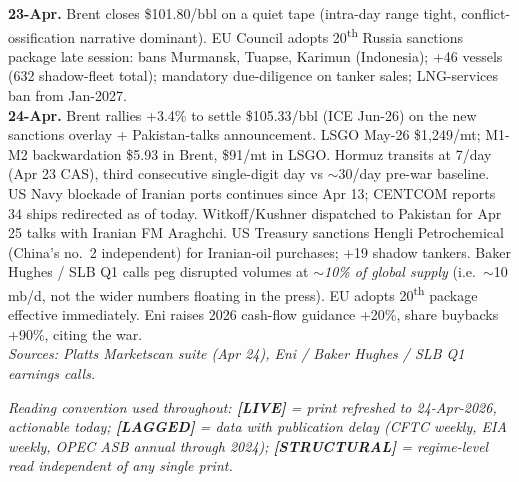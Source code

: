 \documentclass[10pt,a4paper]{article}
\begin{document}
\begin{tcolorbox}[colback=obbg,colframe=obblue,coltitle=white,fonttitle=\bfseries,title={Macro context, 23 and 24 April 2026},boxrule=0.6pt,arc=2pt,left=6pt,right=6pt,top=4pt,bottom=4pt]
\footnotesize
\textbf{23-Apr.} Brent closes \$101.80/bbl on a quiet tape (intra-day range tight, conflict-ossification narrative dominant). EU Council adopts 20\textsuperscript{th} Russia sanctions package late session: bans Murmansk, Tuapse, Karimun (Indonesia); +46 vessels (632 shadow-fleet total); mandatory due-diligence on tanker sales; LNG-services ban from Jan-2027. \\[2pt]
\textbf{24-Apr.} Brent rallies +3.4\% to settle \$105.33/bbl (ICE Jun-26) on the new sanctions overlay + Pakistan-talks announcement. LSGO May-26 \$1,249/mt; M1-M2 backwardation \$5.93 in Brent, \$91/mt in LSGO. Hormuz transits at 7/day (Apr 23 CAS), third consecutive single-digit day vs $\sim$30/day pre-war baseline. US Navy blockade of Iranian ports continues since Apr 13; CENTCOM reports 34 ships redirected as of today. Witkoff/Kushner dispatched to Pakistan for Apr 25 talks with Iranian FM Araghchi. US Treasury sanctions Hengli Petrochemical (China's no.\ 2 independent) for Iranian-oil purchases; +19 shadow tankers. Baker Hughes / SLB Q1 calls peg disrupted volumes at \emph{$\sim$10\% of global supply} (i.e.\ $\sim$10 mb/d, not the wider numbers floating in the press). EU adopts 20\textsuperscript{th} package effective immediately. Eni raises 2026 cash-flow guidance +20\%, share buybacks +90\%, citing the war. \\[2pt]
{\footnotesize\textit{Sources: Platts Marketscan suite (Apr 24), Eni / Baker Hughes / SLB Q1 earnings calls.}}
\end{tcolorbox}

\vspace{0.05cm}
{\footnotesize\textit{Reading convention used throughout: \textbf{[LIVE]} = print refreshed to 24-Apr-2026, actionable today; \textbf{[LAGGED]} = data with publication delay (CFTC weekly, EIA weekly, OPEC ASB annual through 2024); \textbf{[STRUCTURAL]} = regime-level read independent of any single print.}}

\vspace{0.15cm}
\end{document}
